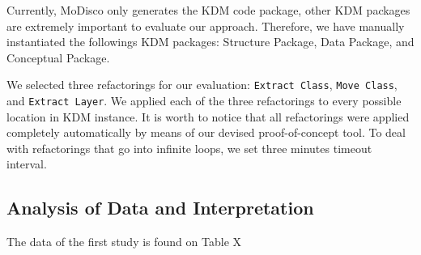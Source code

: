 Currently, MoDisco only generates the KDM code package, other KDM packages are extremely important to evaluate our approach. Therefore, we have manually instantiated the followings KDM packages: Structure Package, Data Package, and Conceptual Package.

We selected three refactorings for our evaluation: \texttt{Extract Class}, \texttt{Move Class}, and \texttt{Extract Layer}. We applied each of the three refactorings to every possible location in KDM instance. It is worth to notice that all refactorings were applied completely automatically by means of our devised proof-of-concept tool. To deal with refactorings that go into infinite loops, we set three minutes timeout interval.



\subsection{Analysis of Data and Interpretation}\label{analysis_of_data}



The data of the first study is found on Table X